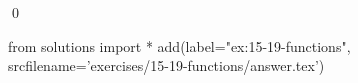 
\begin{ex}
  \label{ex:15-19-functions}
  
  \qed
\end{ex}
\begin{python0}
from solutions import *
add(label="ex:15-19-functions",
    srcfilename='exercises/15-19-functions/answer.tex')
\end{python0}
